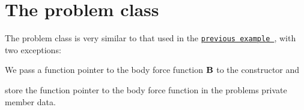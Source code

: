  

\hypertarget{index_problem}{}\section{The problem class}\label{index_problem}
The problem class is very similar to that used in the \href{../../adaptive_driven_cavity/html/index.html#problem}{\tt previous example }, with two exceptions\+:


\begin{DoxyItemize}
\item We pass a function pointer to the body force function $ {\bf B}$ to the constructor and
\item store the function pointer to the body force function in the problem\textquotesingle{}s private member data.
\end{DoxyItemize}

